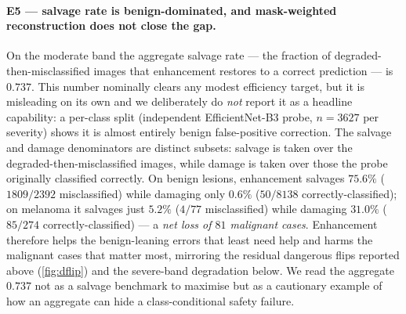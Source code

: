 \paragraph{E5 --- salvage rate is benign-dominated, and mask-weighted reconstruction does not
close the gap.}
On the moderate band the aggregate salvage rate --- the fraction of degraded-then-misclassified
images that enhancement restores to a correct prediction --- is $0.737$. This number nominally
clears any modest efficiency target, but it is misleading on its own and we deliberately do
\emph{not} report it as a headline capability: a per-class split (independent EfficientNet-B3
probe, $n=3627$ per severity) shows it is almost entirely benign false-positive correction. The
salvage and damage denominators are distinct subsets: salvage is taken over the
degraded-then-misclassified images, while damage is taken over those the probe originally
classified correctly. On benign lesions, enhancement salvages $75.6\%$ ($1809/2392$
misclassified) while damaging only $0.6\%$ ($50/8138$ correctly-classified); on melanoma it
salvages just $5.2\%$ ($4/77$ misclassified) while damaging $31.0\%$ ($85/274$
correctly-classified) --- a \emph{net loss of $81$ malignant cases}. Enhancement therefore helps
the benign-leaning errors that least need help and harms the malignant cases that matter most,
mirroring the residual dangerous flips reported above (\cref{fig:dflip}) and the severe-band
degradation below. We read the aggregate $0.737$ not as a salvage benchmark to maximise but as a
cautionary example of how an aggregate can hide a class-conditional safety failure.

